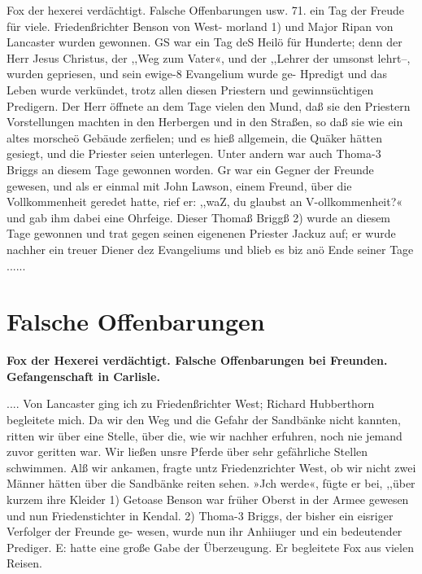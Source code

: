 Fox der hexerei verdächtigt. Falsche Offenbarungen usw. 71.
ein Tag der Freude für viele. Friedenßrichter Benson von West-
morland 1) und Major Ripan von Lancaster wurden gewonnen.
GS war ein Tag deS Heilö für Hunderte; denn der Herr Jesus
Christus, der ,,Weg zum Vater«, und der ,,Lehrer der umsonst
lehrt--, wurden gepriesen, und sein ewige-8 Evangelium wurde ge-
Hpredigt und das Leben wurde verkündet, trotz allen diesen Priestern
und gewinnsüchtigen Predigern. Der Herr öffnete an dem Tage
vielen den Mund, daß sie den Priestern Vorstellungen machten
in den Herbergen und in den Straßen, so daß sie wie ein altes
morscheö Gebäude zerfielen; und es hieß allgemein, die Quäker
hätten gesiegt, und die Priester seien unterlegen. Unter andern
war auch Thoma-3 Briggs an diesem Tage gewonnen worden. Gr
war ein Gegner der Freunde gewesen, und als er einmal mit
John Lawson, einem Freund, über die Vollkommenheit geredet hatte,
rief er: ,,waZ, du glaubst an V-ollkommenheit?« und gab ihm dabei
eine Ohrfeige. Dieser Thomaß Briggß 2) wurde an diesem Tage
gewonnen und trat gegen seinen eigenenen Priester Jackuz auf; er
wurde nachher ein treuer Diener dez Evangeliums und blieb es
biz anö Ende seiner Tage ......



\chapter[Falsche Offenbarungen]{Falsche Offenbarungen}

\begin{center}
\textbf{Fox der Hexerei verdächtigt. Falsche Offenbarungen 
bei Freunden. Gefangenschaft in Carlisle.}
\end{center}

.... Von Lancaster ging ich zu Friedenßrichter West; Richard
Hubberthorn begleitete mich. Da wir den Weg und die Gefahr
der Sandbänke nicht kannten, ritten wir über eine Stelle, über
die, wie wir nachher erfuhren, noch nie jemand zuvor geritten
war. Wir ließen unsre Pferde über sehr gefährliche Stellen
schwimmen. Alß wir ankamen, fragte untz Friedenzrichter West,
ob wir nicht zwei Männer hätten über die Sandbänke reiten
sehen. »Jch werde«, fügte er bei, ,,über kurzem ihre Kleider
1) Getoase Benson war früher Oberst in der Armee gewesen und nun
Friedenstichter in Kendal.
2) Thoma-3 Briggs, der bisher ein eisriger Verfolger der Freunde ge-
wesen, wurde nun ihr Anhiiuger und ein bedeutender Prediger. E: hatte eine
große Gabe der Überzeugung. Er begleitete Fox aus vielen Reisen.


